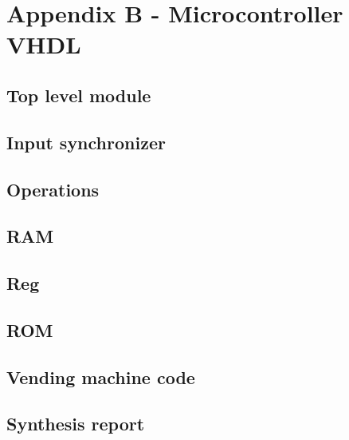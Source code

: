 \section{Appendix B - Microcontroller VHDL}
\subsection{Top level module}


\subsection{Input synchronizer}


\subsection{Operations}


\subsection{RAM}


\subsection{Reg}


\subsection{ROM}


\subsection{Vending machine code}


\subsection{Synthesis report}

